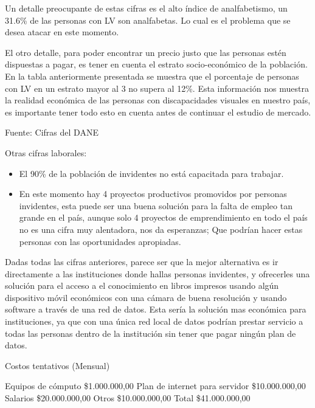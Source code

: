 \documentclass[a4paper, 12pt, oneside]{article}
\begin{document}
	


Un detalle preocupante de estas cifras es el alto índice de analfabetismo, un 31.6\% de las personas con LV son analfabetas. Lo cual es el problema que se desea atacar en este momento. 


	El otro detalle, para poder encontrar un precio justo que las personas estén dispuestas a pagar, es tener en cuenta el estrato socio-económico de la población. En la tabla anteriormente presentada se muestra que el porcentaje de personas con LV en un estrato mayor al 3 no supera al 12\%. Esta información nos muestra la realidad económica de las personas con discapacidades visuales en nuestro país, es importante tener todo esto en cuenta antes de continuar el estudio de mercado. 

	Fuente: Cifras del DANE

Otras cifras laborales:

	\begin{itemize} 
	\item El 90\% de la población de invidentes no está capacitada para trabajar.
	\item En este momento hay 4 proyectos productivos promovidos por personas invidentes, esta puede ser una buena solución para la falta de empleo tan grande en el país, aunque solo 4 proyectos de emprendimiento en todo el país no es una cifra muy alentadora, nos da esperanzas; Que podrían hacer estas personas con las oportunidades apropiadas. 
	\end{itemize}

	Dadas todas las cifras anteriores, parece ser que la mejor alternativa es ir directamente a las instituciones donde hallas personas invidentes, y ofrecerles una solución para el acceso a el conocimiento en libros impresos usando algún dispositivo móvil económicos con una cámara de buena resolución y usando software a través de una red de datos. Esta sería la solución mas económica para instituciones, ya que con una única red local de datos podrían prestar servicio a todas las personas dentro de la institución sin tener que pagar ningún plan de datos.

Costos tentativos (Mensual)

Equipos de cómputo \$1.000.000,00
Plan de internet para servidor \$10.000.000,00
Salarios \$20.000.000,00
Otros \$10.000.000,00
Total \$41.000.000,00
\end{document}
